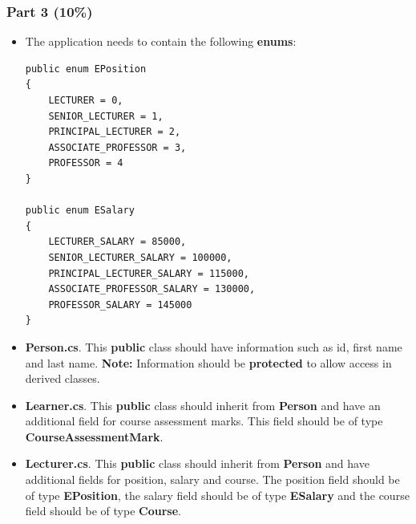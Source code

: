 \documentclass{article}
\begin{document}
\subsubsection*{Part 3 (10\%)}

\begin{itemize}
    \item The application needs to contain the following \textbf{enums}:
    \begin{verbatim}
public enum EPosition
{
    LECTURER = 0,
    SENIOR_LECTURER = 1,
    PRINCIPAL_LECTURER = 2,
    ASSOCIATE_PROFESSOR = 3,
    PROFESSOR = 4
}
            
public enum ESalary
{
    LECTURER_SALARY = 85000,
    SENIOR_LECTURER_SALARY = 100000,
    PRINCIPAL_LECTURER_SALARY = 115000,
    ASSOCIATE_PROFESSOR_SALARY = 130000,
    PROFESSOR_SALARY = 145000
}
    \end{verbatim}
    \item \textbf{Person.cs}. This \textbf{public} class should have information such as id, first name and last name. \textbf{Note:} Information should be \textbf{protected} to allow access in derived classes.
    \item \textbf{Learner.cs}. This \textbf{public} class should inherit from \textbf{Person} and have an additional field for course assessment marks. This field should be of type \textbf{CourseAssessmentMark}.
    \item \textbf{Lecturer.cs}. This \textbf{public} class should inherit from \textbf{Person} and have additional fields for position, salary and course. The position field should be of type \textbf{EPosition}, the salary field should be of type \textbf{ESalary} and the course field should be of type \textbf{Course}.
\end{itemize}
\end{document}
